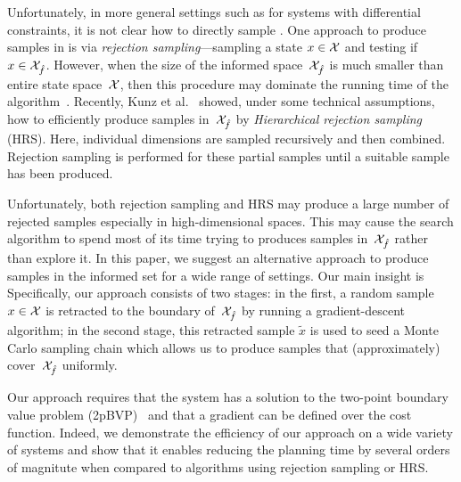 \documentclass[letterpaper, 10 pt, conference]{ieeeconf}  %
\begin{document}
Unfortunately, in more general settings such as
for systems with differential constraints,
it is not clear how to directly sample \Cinf.
%
One approach to produce samples in \Cinf is via \emph{rejection sampling}---sampling a state $x \in \mathcal{X}$ and testing if $x \in \mathcal{X}_{\hat{f}}$.
However, when the size of the informed space~$\mathcal{X}_{\hat{f}}$ is much smaller than entire state space~$\mathcal{X}$, then this procedure may dominate the running time of the algorithm~\cite{KTC16}.
Recently, Kunz et al.~\cite{KTC16} showed, under some technical assumptions, how to efficiently produce samples in~$\mathcal{X}_{\hat{f}}$ by \emph{Hierarchical rejection sampling} (HRS). 
Here, individual dimensions are sampled recursively 
and then combined. Rejection sampling is performed for these partial samples until a suitable sample has been produced. 

Unfortunately, both rejection sampling and HRS may produce a large number of rejected samples especially in high-dimensional spaces.
This may cause the search algorithm to spend most of its time trying to produces samples in~$\mathcal{X}_{\hat{f}}$ rather than explore it.
In this paper, we suggest an alternative approach to produce samples in the informed set \Cinf for a wide range of settings.
Our main insight is 
Specifically, our approach consists of two stages:
in the first, a random sample $x \in \mathcal{X}$ is retracted to the boundary of~$\mathcal{X}_{\hat{f}}$ by running a gradient-descent algorithm;
in the second stage, this retracted sample $\tilde{x}$ is used to seed a Monte Carlo sampling chain which allows us to  produce samples that (approximately) cover~$\mathcal{X}_{\hat{f}}$  uniformly.

Our approach requires that the system has a solution to the two-point boundary value problem (2pBVP)~\cite{L06, H02} and that a gradient can be defined over the cost function.
Indeed, we demonstrate the efficiency of our approach on a wide variety of systems and show that it enables reducing the planning time by several orders of magnitute when compared to algorithms using rejection sampling or HRS.

%
\end{document}

